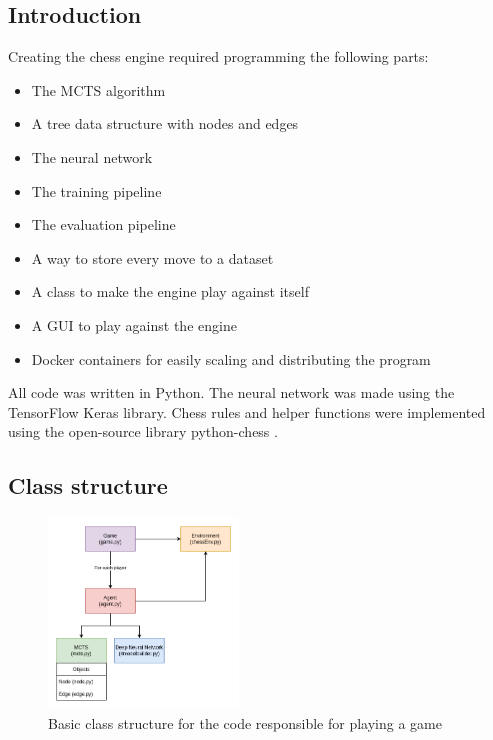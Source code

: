 \documentclass{article}
\begin{document}
\subsection{Introduction}

Creating the chess engine required programming the following parts:

\begin{itemize}
    \item The MCTS algorithm
    \item A tree data structure with nodes and edges
    \item The neural network
    \item The training pipeline
    \item The evaluation pipeline
    \item A way to store every move to a dataset
    \item A class to make the engine play against itself
    \item A GUI to play against the engine
    \item Docker containers for easily scaling and distributing the program
\end{itemize}

All code was written in Python. The neural network was made using the TensorFlow Keras library.
Chess rules and helper functions were implemented using the open-source library python-chess \cite{PythonchessChessLibrarya}.

\subsection{Class structure}

\begin{figure}[H]
    \centering
    \includegraphics[width=0.45\textwidth]{img/class-structure.png}
    \caption{Basic class structure for the code responsible for playing a game}
\end{figure}
\end{document}
